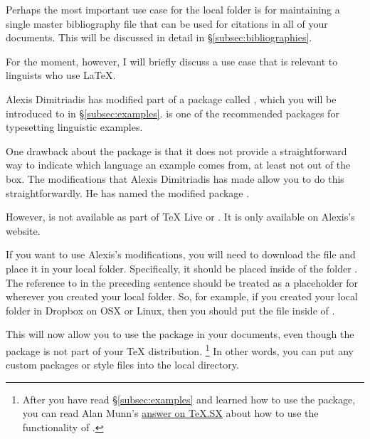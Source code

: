 Perhaps the most important use case for the local  folder is for maintaining a single master bibliography file that can be used for citations in all of your documents.
This will be discussed in detail in \S\ref{subsec:bibliographies}.

For the moment, however, I will briefly discuss a use case that is relevant to linguists who use \LaTeX.

Alexis Dimitriadis has modified part of a package called , which you will be introduced to in \S\ref{subsec:examples}.
 is one of the recommended packages for typesetting linguistic examples.

One drawback about the  package is that it does not provide a straightforward way to indicate which language an example comes from, at least not out of the box.
The modifications that Alexis Dimitriadis has made allow you to do this straightforwardly.
He has named the modified package \href{http://www.let.uu.nl/~Alexis.Dimitriadis/personal/latex/cgloss.sty}{}.

However,  is not available as part of TeX Live or .
It is only available on Alexis's website.

If you want to use Alexis's modifications, you will need to download the file \href{http://www.let.uu.nl/~Alexis.Dimitriadis/personal/latex/cgloss.sty}{} and place it in your local  folder.
Specifically, it should be placed inside of the folder .
The reference to  in the preceding sentence should be treated as a placeholder for wherever you created your local  folder.
So, for example, if you created your local  folder in Dropbox on OSX or Linux, then you should put the file inside of .

This will now allow you to use the  package in your  documents, even though the package is not part of your \TeX{} distribution.%
\footnote{%
After you have read \S\ref{subsec:examples} and learned how to use the  package, you can read Alan Munn's \href{http://tex.stackexchange.com/a/49583/32888}{answer on TeX.SX} about how to use the functionality of .%
}
In other words, you can put any custom packages or style files into the local  directory.